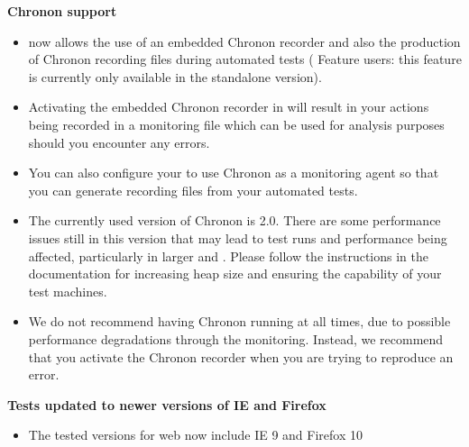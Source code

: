 \textbf{Chronon support}
\begin{itemize}
\item \app{} now allows the use of an embedded Chronon recorder and also the production of Chronon recording files during automated tests (\jb{} Feature users: this feature is currently only available in the standalone version). 
\item Activating the embedded Chronon recorder in \app{} will result in your actions being recorded in a monitoring file which can be used for analysis purposes should you encounter any errors.
\item You can also configure your \gdaut{} to use Chronon as a monitoring agent so that you can generate recording files from your automated tests. 
\item The currently used version of Chronon is 2.0. There are some performance issues still in this version that may lead to test runs and performance being affected, particularly in larger \gdauts{} and \gdprojects{}. Please follow the instructions in the documentation for increasing heap size and ensuring the capability of your test machines. 
\item We do not recommend having Chronon running at all times, due to possible performance degradations through the monitoring. Instead, we recommend that you activate the Chronon recorder when you are trying to reproduce an error.
\end{itemize}

\textbf{Tests updated to newer versions of IE and Firefox}
\begin{itemize}
\item The tested versions for web \gdauts{} now include IE 9 and Firefox 10
\end{itemize}




